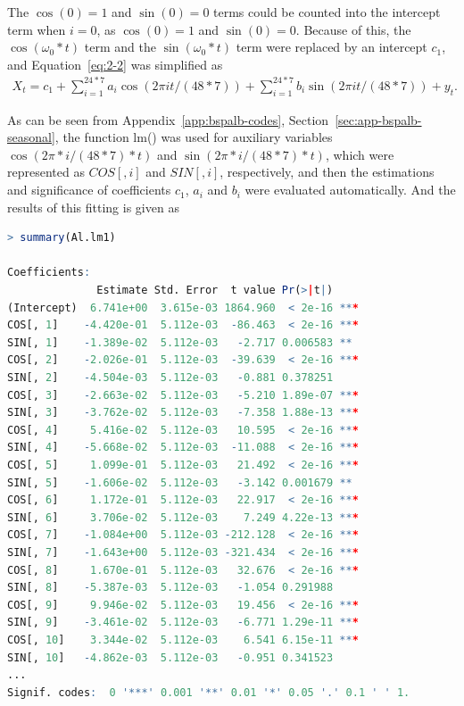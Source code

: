 \documentclass[12pt,msc]{uom_eee_dissertation_casson}
\newcommand{\secref}[1]{Section~\ref{#1}}
\newcommand{\appref}[1]{Appendix~\ref{#1}}
\newcommand{\eqnref}[1]{Equation~\eqref{#1}}
\begin{document}
The $\cos(0)=1$ and $\sin(0)=0$ terms could be counted into the intercept term when $i=0$, as $\cos(0)=1$ and $\sin(0)=0$. Because of this, the $\cos(\omega_{0} * t)$ term and the $\sin(\omega_{0} * t)$ term were replaced by an intercept $c_{1}$, and \eqnref{eq:2-2} was simplified as
\begin{equation}
\label{eq:2-3}
\begin{aligned}
X_{t}=c_{1}+\sum^{24*7}_{i=1} a_{i}\cos(2\pi it/(48*7)) +\sum^{24*7}_{i=1} b_{i}\sin(2\pi it/(48*7))+y_{t}.
\end{aligned}
\end{equation}

As can be seen from \appref{app:bspalb-codes}, \secref{sec:app-bspalb-seasonal}, the function lm() was used for auxiliary variables $\cos(2\pi *i/(48*7)*t)$ and $\sin(2\pi *i/(48*7)*t)$, which were represented as $COS[, i]$ and $SIN[, i]$, respectively, and then the estimations and significance of coefficients $c_{1}$, $a_{i}$ and $b_{i}$ were evaluated automatically. And the results of this fitting is given as
\begin{lstlisting}[language=R,breaklines=true]
> summary(Al.lm1)

Coefficients:
              Estimate Std. Error  t value Pr(>|t|)
(Intercept)  6.741e+00  3.615e-03 1864.960  < 2e-16 ***
COS[, 1]    -4.420e-01  5.112e-03  -86.463  < 2e-16 ***
SIN[, 1]    -1.389e-02  5.112e-03   -2.717 0.006583 **
COS[, 2]    -2.026e-01  5.112e-03  -39.639  < 2e-16 ***
SIN[, 2]    -4.504e-03  5.112e-03   -0.881 0.378251
COS[, 3]    -2.663e-02  5.112e-03   -5.210 1.89e-07 ***
SIN[, 3]    -3.762e-02  5.112e-03   -7.358 1.88e-13 ***
COS[, 4]     5.416e-02  5.112e-03   10.595  < 2e-16 ***
SIN[, 4]    -5.668e-02  5.112e-03  -11.088  < 2e-16 ***
COS[, 5]     1.099e-01  5.112e-03   21.492  < 2e-16 ***
SIN[, 5]    -1.606e-02  5.112e-03   -3.142 0.001679 **
COS[, 6]     1.172e-01  5.112e-03   22.917  < 2e-16 ***
SIN[, 6]     3.706e-02  5.112e-03    7.249 4.22e-13 ***
COS[, 7]    -1.084e+00  5.112e-03 -212.128  < 2e-16 ***
SIN[, 7]    -1.643e+00  5.112e-03 -321.434  < 2e-16 ***
COS[, 8]     1.670e-01  5.112e-03   32.676  < 2e-16 ***
SIN[, 8]    -5.387e-03  5.112e-03   -1.054 0.291988
COS[, 9]     9.946e-02  5.112e-03   19.456  < 2e-16 ***
SIN[, 9]    -3.461e-02  5.112e-03   -6.771 1.29e-11 ***
COS[, 10]    3.344e-02  5.112e-03    6.541 6.15e-11 ***
SIN[, 10]   -4.862e-03  5.112e-03   -0.951 0.341523
...
Signif. codes:  0 '***' 0.001 '**' 0.01 '*' 0.05 '.' 0.1 ' ' 1.
\end{lstlisting}
\end{document}
